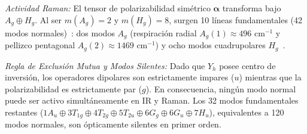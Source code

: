 \textit{Actividad Raman:} El tensor de polarizabilidad simétrico $\bm{\alpha}$ transforma bajo $A_g \oplus H_g$. Al ser $m(A_g) = 2$ y $m(H_g) = 8$, surgen 10 líneas fundamentales (42 modos normales)~\cite{Kuzmany1994, Qin2025}: dos modos $A_g$ (respiración radial $A_g(1) \approx 496\text{ cm}^{-1}$ y pellizco pentagonal $A_g(2) \approx 1469\text{ cm}^{-1}$) y ocho modos cuadrupolares $H_g$~\cite{Qin2025}.

\textit{Regla de Exclusión Mutua y Modos Silentes:} Dado que $Y_h$ posee centro de inversión, los operadores dipolares son estrictamente impares ($u$) mientras que la polarizabilidad es estrictamente par ($g$). En consecuencia, ningún modo normal puede ser activo simultáneamente en IR y Raman. Los 32 modos fundamentales restantes ($1A_u \oplus 3T_{1g} \oplus 4T_{2g} \oplus 5T_{2u} \oplus 6G_g \oplus 6G_u \oplus 7H_u$), equivalentes a 120 modos normales, son ópticamente silentes en primer orden.

